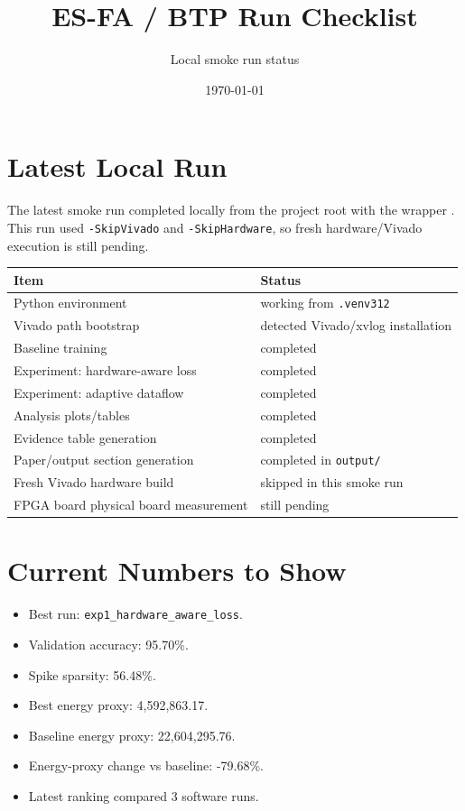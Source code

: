 \documentclass[11pt]{article}
\title{ES-FA / BTP Run Checklist}
\author{Local smoke run status}
\date{\today}
\begin{document}
\maketitle

\section*{Latest Local Run}
The latest smoke run completed locally from the project root with the wrapper
. This run used \texttt{-SkipVivado} and
\texttt{-SkipHardware}, so fresh hardware/Vivado execution is still pending.

\begin{center}
\begin{tabular}{ll}
\toprule
Item & Status \\
\midrule
Python environment & working from \texttt{.venv312} \\
Vivado path bootstrap & detected Vivado/xvlog installation \\
Baseline training & completed \\
Experiment: hardware-aware loss & completed \\
Experiment: adaptive dataflow & completed \\
Analysis plots/tables & completed \\
Evidence table generation & completed \\
Paper/output section generation & completed in \texttt{output/} \\
Fresh Vivado hardware build & skipped in this smoke run \\
FPGA board physical board measurement & still pending \\
\bottomrule
\end{tabular}
\end{center}

\section*{Current Numbers to Show}
\begin{itemize}
\item Best run: \texttt{exp1\_hardware\_aware\_loss}.
\item Validation accuracy: 95.70\%.
\item Spike sparsity: 56.48\%.
\item Best energy proxy: 4,592,863.17.
\item Baseline energy proxy: 22,604,295.76.
\item Energy-proxy change vs baseline: -79.68\%.
\item Latest ranking compared 3 software runs.
\end{itemize}
\end{document}
